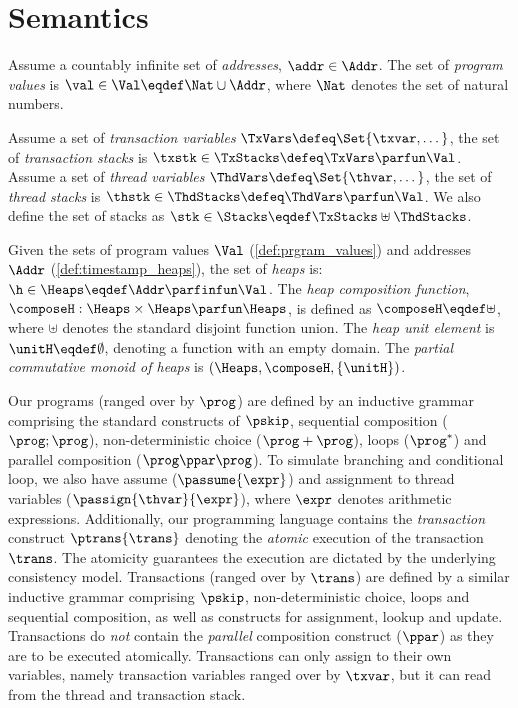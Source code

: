 \section{Semantics\label{sec:semantics}}
\begin{defn}
\label{def:prgram_values}
Assume a countably infinite set of \emph{addresses}, $\addr \in \Addr$. The set of \emph{program values} is $\val \in \Val \eqdef \Nat \cup \Addr$, where $\Nat$ denotes the set of natural numbers.
\end{defn}
 
\begin{defn}[Stacks]
\label{def:stacks}
Assume a set of \emph{transaction variables} \( \TxVars \defeq \Set{\txvar, \dots}\), the set of \emph{transaction stacks} is \( \txstk \in \TxStacks \defeq \TxVars \parfun \Val \).
Assume a set of \emph{thread variables} \( \ThdVars \defeq \Set{\thvar, \dots}\), the set of \emph{thread stacks} is \( \thstk \in \ThdStacks \defeq \ThdVars \parfun \Val \).
We also define the set of stacks as \( \stk \in \Stacks \eqdef \TxStacks \uplus \ThdStacks \).
\end{defn}

\begin{definition}[Heaps]
\label{def:heaps}
Given the sets of program values $\Val$ (\ref{def:prgram_values}) and  addresses $\Addr$ (\ref{def:timestamp_heaps}), the set of \emph{ heaps} is: $\h \in \Heaps \eqdef \Addr \parfinfun \Val$.
The \emph{heap composition function}, $\composeH: \Heaps \times \Heaps \parfun \Heaps$, is defined as $\composeH \eqdef \uplus$, where $\uplus$ denotes the standard disjoint function union. The \emph{ heap unit element} is $\unitH \eqdef \emptyset$, denoting a function with an empty domain.
The \emph{partial commutative monoid of  heaps} is $(\Heaps, \composeH, \{\unitH\})$.
\end{definition}

Our programs (ranged over by $\prog$) are defined by an inductive grammar comprising the standard constructs of $\pskip$, sequential composition ($\prog; \prog$), non-deterministic choice ($\prog+\prog$), loops ($\prog^*$) and  parallel composition ($\prog \ppar \prog$).
To simulate branching and conditional loop, we also have assume (\( \passume{\expr}\)) and assignment to thread variables (\( \passign{\thvar}{\expr} \)), where \( \expr \) denotes arithmetic expressions.
Additionally, our programming language contains the \emph{transaction} construct $\ptrans{\trans}$ denoting the \emph{atomic} execution of the transaction $\trans$. 
The atomicity guarantees the execution are dictated by the underlying consistency model.
Transactions (ranged over by $\trans$) are defined by a similar inductive grammar comprising $\pskip$, non-deterministic choice, loops and sequential composition, as well as constructs for assignment, lookup and update. 
Transactions do \emph{not} contain the \emph{parallel} composition construct ($\ppar$) as they are to be executed atomically.
Transactions can only assign to their own variables, namely transaction variables ranged over by \( \txvar \), but it can read from the thread and transaction stack.

